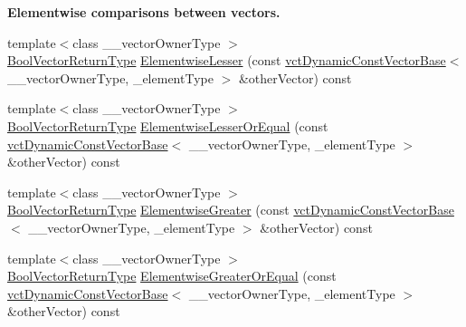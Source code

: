 \begin{Indent}{\bf Elementwise comparisons between vectors.}
\begin{DoxyCompactItemize}
\item 
{\footnotesize template$<$class \-\_\-\-\_\-vector\-Owner\-Type $>$ }\\\hyperlink{classvct_dynamic_const_vector_base_a2de5b9c0f8c70782c548808d3ae4a453}{Bool\-Vector\-Return\-Type} \hyperlink{classvct_dynamic_const_vector_base_a4a0e8e8b86bc24e798ac7a5d71436a5b}{Elementwise\-Lesser} (const \hyperlink{classvct_dynamic_const_vector_base}{vct\-Dynamic\-Const\-Vector\-Base}$<$ \-\_\-\-\_\-vector\-Owner\-Type, \-\_\-element\-Type $>$ \&other\-Vector) const 
\item 
{\footnotesize template$<$class \-\_\-\-\_\-vector\-Owner\-Type $>$ }\\\hyperlink{classvct_dynamic_const_vector_base_a2de5b9c0f8c70782c548808d3ae4a453}{Bool\-Vector\-Return\-Type} \hyperlink{classvct_dynamic_const_vector_base_aa925079679de7fb2afd65abf059ad05d}{Elementwise\-Lesser\-Or\-Equal} (const \hyperlink{classvct_dynamic_const_vector_base}{vct\-Dynamic\-Const\-Vector\-Base}$<$ \-\_\-\-\_\-vector\-Owner\-Type, \-\_\-element\-Type $>$ \&other\-Vector) const 
\item 
{\footnotesize template$<$class \-\_\-\-\_\-vector\-Owner\-Type $>$ }\\\hyperlink{classvct_dynamic_const_vector_base_a2de5b9c0f8c70782c548808d3ae4a453}{Bool\-Vector\-Return\-Type} \hyperlink{classvct_dynamic_const_vector_base_a8bed1d384abdaf783e051da23aa232f7}{Elementwise\-Greater} (const \hyperlink{classvct_dynamic_const_vector_base}{vct\-Dynamic\-Const\-Vector\-Base}$<$ \-\_\-\-\_\-vector\-Owner\-Type, \-\_\-element\-Type $>$ \&other\-Vector) const 
\item 
{\footnotesize template$<$class \-\_\-\-\_\-vector\-Owner\-Type $>$ }\\\hyperlink{classvct_dynamic_const_vector_base_a2de5b9c0f8c70782c548808d3ae4a453}{Bool\-Vector\-Return\-Type} \hyperlink{classvct_dynamic_const_vector_base_ac9333c47b0e899552b71c3d16080b99b}{Elementwise\-Greater\-Or\-Equal} (const \hyperlink{classvct_dynamic_const_vector_base}{vct\-Dynamic\-Const\-Vector\-Base}$<$ \-\_\-\-\_\-vector\-Owner\-Type, \-\_\-element\-Type $>$ \&other\-Vector) const 
\end{DoxyCompactItemize}
\end{Indent}
